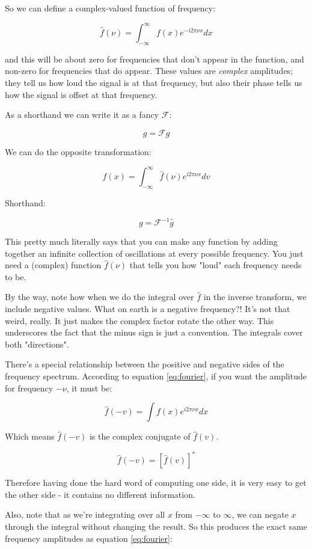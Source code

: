 So we can define a complex-valued function of frequency:

\begin{equation}
    \hat{f}(\nu) = \int_{-\infty}^{\infty} f(x)e^{-i2\pi\nu x} dx
    \label{eq:fourier}
\end{equation}

and this will be about zero for frequencies that don't appear in the function, and non-zero for frequencies that do appear. These values are \textit{complex} amplitudes; they tell us how loud the signal is at that frequency, but also their phase tells us how the signal is offset at that frequency.

As a shorthand we can write it as a fancy $\mathcal{F}$:

$$\hat{g} = \mathcal{F} g$$

We can do the opposite transformation:

$$
f(x) = \int_{-\infty}^{\infty} \hat{f}(\nu)e^{i2\pi\nu x} dv
\label{eq:invfourier}
$$

Shorthand:

$$g = \mathcal{F}^{-1} \hat{g}$$

This pretty much literally says that you can make any function by adding together an infinite collection of oscillations at every possible frequency. You just need a (complex) function $\hat{f}(\nu)$ that tells you how "loud" each frequency needs to be.

By the way, note how when we do the integral over $\hat{f}$ in the inverse transform, we include negative values. What on earth is a negative frequency?! It's not that weird, really. It just makes the complex factor rotate the other way. This underscores the fact that the minus sign is just a convention. The integrals cover both "directions".

There's a special relationship between the positive and negative sides of the frequency spectrum. According to equation \ref{eq:fourier}, if you want the amplitude for frequency $-\nu$, it must be:

$$
\hat{f}(-v) = \int f(x)e^{i2\pi\nu x} dx
\label{3}
$$

Which means $\hat{f}(-v)$ is the complex conjugate of $\hat{f}(v)$.

$$
\hat{f}(-v) = \left[ \hat{f}(v) \right]^*
$$

Therefore having done the hard word of computing one side, it is very easy to get the other side - it contains no different information.

Also, note that as we're integrating over all $x$ from $-\infty$ to $\infty$, we can negate $x$ through the integral without changing the result. So this produces the exact same frequency amplitudes as equation \ref{eq:fourier}:

